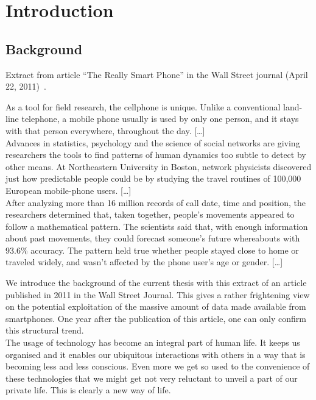 \chapter{Introduction}

\section{Background}

Extract from article ``The Really Smart Phone'' in the Wall Street journal (April 22, 2011)~\cite{really-smart-phone}.

\begin{quotationalt}
  [\dots]
  As a tool for field research, the cellphone is unique. Unlike a
  conventional land-line telephone, a mobile phone usually is used by
  only one person, and it stays with that person everywhere,
  throughout the day.
  [\dots]\\

  Advances in statistics, psychology and the
  science of social networks are giving researchers the tools to find
  patterns of human dynamics too subtle to detect by other means. At
  Northeastern University in Boston, network physicists discovered
  just how predictable people could be by studying the travel routines
  of 100,000 European mobile-phone users.
  [\dots]\\

  After analyzing more than
  16 million records of call date, time and position, the researchers
  determined that, taken together, people's movements appeared to
  follow a mathematical pattern. The scientists said that, with enough
  information about past movements, they could forecast someone's
  future whereabouts with 93.6\% accuracy.
  The pattern held true whether people stayed close to home or
  traveled widely, and wasn't affected by the phone user's age or
  gender.
  [\dots]\\
\end{quotationalt}

We introduce the background of the current thesis with this extract of an article published in 2011 in the Wall Street Journal.
This gives a rather frightening view on the potential exploitation of the massive amount of data made available from smartphones.
One year after the publication of this article, one can only confirm this structural trend.\\

The usage of technology has become an integral part of human life.
It keeps us organised and it enables our ubiquitous interactions with others in a way that is becoming less and less conscious.
Even more we get so used to the convenience of these technologies that we might get not very reluctant to unveil a part of our private life.
This is clearly a new way of life.\\

